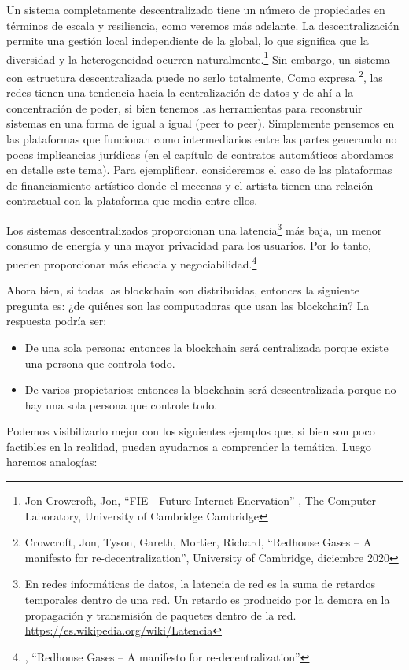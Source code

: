 \documentclass[12pt]{report} %
\begin{document}
Un sistema completamente descentralizado tiene un número de propiedades en términos de escala y resiliencia, como veremos más adelante. La descentralización permite una gestión local independiente de la global, lo que significa que la diversidad y la heterogeneidad ocurren naturalmente.\footnote{Jon Crowcroft, Jon, “FIE - Future Internet Enervation” , The Computer Laboratory, University of Cambridge Cambridge}  Sin embargo, un sistema con estructura descentralizada puede no serlo totalmente, Como expresa  \footnote{Crowcroft, Jon, Tyson, Gareth, Mortier, Richard, “Redhouse Gases – A manifesto for re-decentralization”, University of Cambridge, diciembre 2020 }, las redes tienen una tendencia hacia la centralización de datos y de ahí a la concentración de poder, si bien tenemos las herramientas para reconstruir sistemas en una forma de igual a igual (peer to peer). Simplemente pensemos en las plataformas que funcionan como intermediarios entre las partes generando no pocas implicancias jurídicas (en el capítulo de contratos automáticos abordamos en detalle este tema). Para ejemplificar, consideremos el caso de las plataformas de financiamiento artístico donde el mecenas y el artista tienen una relación contractual con la plataforma que media entre ellos. 

Los sistemas descentralizados proporcionan una latencia\footnote{En redes informáticas de datos, la latencia de red es la suma de retardos temporales dentro de una red. Un retardo es producido por la demora en la propagación y transmisión de paquetes dentro de la red. \url{https://es.wikipedia.org/wiki/Latencia}}  más baja, un menor consumo de energía y una mayor privacidad para los usuarios. Por lo tanto, pueden proporcionar más eficacia y negociabilidad.\footnote{\cite{JonGareth2020}, “Redhouse Gases – A manifesto for re-decentralization”} 

Ahora bien, si todas las blockchain son distribuidas, entonces la siguiente pregunta es: ¿de quiénes son las computadoras que usan las blockchain? La respuesta podría ser:

\begin{itemize}
    \item De una sola persona: entonces la blockchain será centralizada porque existe una persona que controla todo.
    \item De varios propietarios: entonces la blockchain será descentralizada porque no hay una sola persona que controle todo.
\end{itemize}

Podemos visibilizarlo mejor con los siguientes ejemplos que, si bien son poco factibles en la realidad, pueden ayudarnos a comprender la temática. Luego haremos analogías:
\end{document}
